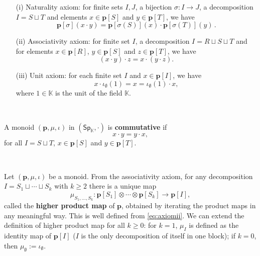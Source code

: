 \documentclass[12pt, reqno]{amsart}
\theoremstyle{definition}
\newcommand{\Ssk}{\mathsf{Sp}_\Kb} %
\newcommand{\Kb}{\mathbb{K}}
\newcommand{\tp}{\mathbf{p}}
\begin{document}
\begin{itemize}
    \item[(i)] Naturality axiom: for finite sets $I,J$, a bijection $\sigma: I \to J$, a decomposition $I=S \sqcup T$ and elements $x \in \tp[S]$ and $y \in \tp[T]$, we have
\begin{equation*}
\tp[\sigma](x \cdot y)=\tp[\sigma(S)](x) \cdot \tp[\sigma(T)](y) \, .
\end{equation*}

\item[(ii)] Associativity axiom: for finite set $I$, a decomposition $I=R \sqcup S \sqcup T$ and for elements $x \in \tp[R]$, $y \in \tp[S]$ and $z \in \tp[T]$, we have
\begin{equation}\label{eq:axiomii}
    (x \cdot y)\cdot z=x \cdot (y \cdot z).
\end{equation}

\item[(iii)] Unit axiom: for each finite set $I$ and $x \in \tp[I]$, we have
\begin{equation*}
 x \cdot \iota_\emptyset(1) = x =  \iota_\emptyset(1) \cdot x,
\end{equation*}
where $1\in \mathbb{K}$ is the unit of the field $\mathbb{K}$.

\end{itemize}


\

A monoid $(\tp, \mu, \iota)$ in $(\Ssk, \cdot)$ is {\bf commutative} if
\begin{equation*}
    x\cdot y=y\cdot x,
\end{equation*}
for all $I=S \sqcup T$, $x \in \tp[S]$ and $y \in \tp[T]$.

\

Let $(\tp, \mu, \iota)$ be a monoid. From the associativity axiom, for any decomposition $I=S_1 \sqcup \cdots \sqcup S_k$ with $k \geq 2$ there is a unique map
\begin{equation}
    \mu_{S_1, \hdots, S_k}: \tp[S_1]\otimes \cdots \otimes \tp[S_k] \to \tp[I],
\end{equation}
called the {\bf higher product map} of $\tp$, obtained by iterating the product maps in any meaningful way. 
This is well defined from \eqref{eq:axiomii}.
We can extend the definition of higher product map for all $k\geq 0$: for $k=1$, $\mu_I$ is defined as the identity map of $\tp[I]$ ($I$ is the only decomposition of itself in one block); if $k=0$, then $\mu_{\emptyset }:=\iota_{\emptyset }$.
\
\end{document}
